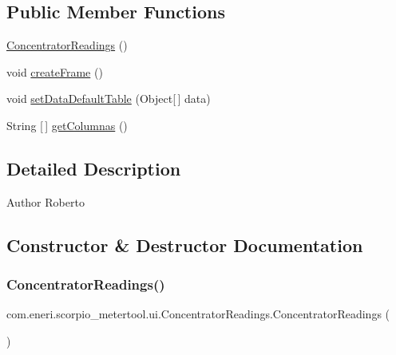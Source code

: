 \subsection*{Public Member Functions}
\begin{DoxyCompactItemize}
\item 
\hyperlink{classcom_1_1eneri_1_1scorpio__metertool_1_1ui_1_1_concentrator_readings_a076ad98b04503afa1c59953d4ae9e65d}{Concentrator\+Readings} ()
\item 
void \hyperlink{classcom_1_1eneri_1_1scorpio__metertool_1_1ui_1_1_concentrator_readings_a5488c49232c90408062b96ce95a8d904}{create\+Frame} ()
\item 
void \hyperlink{classcom_1_1eneri_1_1scorpio__metertool_1_1ui_1_1_concentrator_readings_a2fd4ea2f9b8b4cb9050237e0c63341da}{set\+Data\+Default\+Table} (Object\mbox{[}$\,$\mbox{]} data)
\item 
String \mbox{[}$\,$\mbox{]} \hyperlink{classcom_1_1eneri_1_1scorpio__metertool_1_1ui_1_1_concentrator_readings_a2379b28e26977446b1beeb80c6371861}{get\+Columnas} ()
\end{DoxyCompactItemize}


\subsection{Detailed Description}
\begin{DoxyAuthor}{Author}
Roberto 
\end{DoxyAuthor}


\subsection{Constructor \& Destructor Documentation}
\mbox{\label{classcom_1_1eneri_1_1scorpio__metertool_1_1ui_1_1_concentrator_readings_a076ad98b04503afa1c59953d4ae9e65d}} 
\subsubsection{\texorpdfstring{Concentrator\+Readings()}{ConcentratorReadings()}}
{\footnotesize\ttfamily com.\+eneri.\+scorpio\+\_\+metertool.\+ui.\+Concentrator\+Readings.\+Concentrator\+Readings (\begin{DoxyParamCaption}{ }\end{DoxyParamCaption})}



